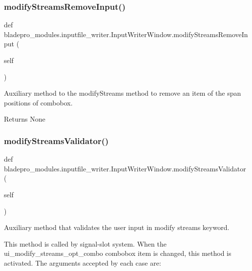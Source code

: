 \subsubsection{\texorpdfstring{modify\+Streams\+Remove\+Input()}{modifyStreamsRemoveInput()}}
{\footnotesize\ttfamily def bladepro\+\_\+modules.\+inputfile\+\_\+writer.\+Input\+Writer\+Window.\+modify\+Streams\+Remove\+Input (\begin{DoxyParamCaption}\item[{}]{self }\end{DoxyParamCaption})}



Auxiliary method to the modify\+Streams method to remove an item of the span positions of combobox. 

\begin{DoxyReturn}{Returns}
None 
\end{DoxyReturn}
\hypertarget{a00070_af60dda179dc289691a59b52cb8ed3e70}{}\label{a00070_af60dda179dc289691a59b52cb8ed3e70} 
\subsubsection{\texorpdfstring{modify\+Streams\+Validator()}{modifyStreamsValidator()}}
{\footnotesize\ttfamily def bladepro\+\_\+modules.\+inputfile\+\_\+writer.\+Input\+Writer\+Window.\+modify\+Streams\+Validator (\begin{DoxyParamCaption}\item[{}]{self }\end{DoxyParamCaption})}



Auxiliary method that validates the user input in modify streams keyword. 

This method is called by signal-\/slot system. When the ui\+\_\+modify\+\_\+streams\+\_\+opt\+\_\+combo combobox item is changed, this method is activated. The arguments accepted by each case are\+:

